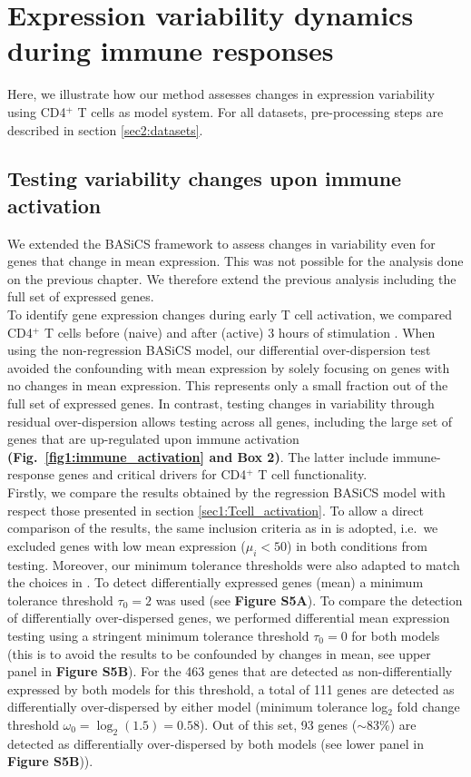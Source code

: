 \section{Expression variability dynamics during immune responses}

Here, we illustrate how our method assesses changes in expression variability using CD4$^+$ T cells as model system. For all datasets, pre-processing steps are described in section \ref{sec2:datasets}. 

\subsection{Testing variability changes upon immune activation}

We extended the BASiCS framework to assess changes in variability even for genes that change in mean expression. This was not possible for the analysis done on the previous chapter. We therefore extend the previous analysis including the full set of expressed genes. \\

To identify gene expression changes during early T cell activation, we compared CD4$^+$ T cells before (naive) and after (active) 3 hours of stimulation \citep{Martinez-jimenez2017}. When using the non-regression BASiCS model, our differential over-dispersion test avoided the confounding with mean expression by solely focusing on genes with no changes in mean expression. This represents only a small fraction 
out of the full set of expressed genes. In contrast, testing changes in variability through residual over-dispersion allows testing across all genes, including the large set of genes that are up-regulated upon immune activation \textbf{(Fig.~\ref{fig1:immune_activation} and Box 2)}. The latter include immune-response genes and critical drivers for CD4$^+$ T cell functionality.\\

Firstly, we compare the results obtained by the regression BASiCS model with respect those presented in section \ref{sec1:Tcell_activation}.  
To allow a direct comparison of the results, the same inclusion criteria as in \cite{Martinez-jimenez2017} is adopted, i.e.~we excluded genes with low mean expression ($\mu_i<50$) in both conditions from testing. Moreover, our  minimum tolerance thresholds were also adapted to match the choices in \cite{Martinez-jimenez2017}. To detect differentially expressed genes (mean) a minimum tolerance threshold $\tau_0 = 2$ was used (see \textbf{Figure S5A}). To compare the detection of differentially over-dispersed genes, we performed differential mean expression testing using a stringent minimum tolerance threshold $\tau_0 = 0$ for both models (this is to avoid the results to be confounded by changes in mean, see upper panel in \textbf{Figure S5B}). For the 463 genes that are detected as non-differentially expressed by both models for this threshold, a total of 111 genes are detected as differentially over-dispersed by either model (minimum tolerance log$_2$ fold change threshold $\omega_0 = \log_2(1.5) = 0.58$). Out of this set, 93 genes ($\sim$83\%) are detected as differentially over-dispersed by both models (see lower panel in \textbf{Figure S5B})). \\

